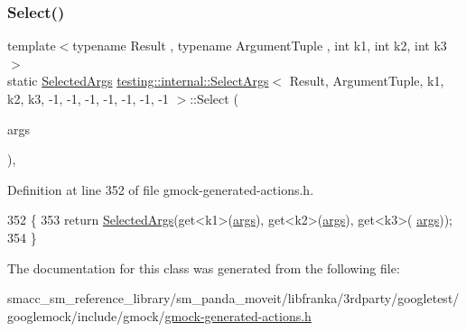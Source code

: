 \subsubsection{\texorpdfstring{Select()}{Select()}}
{\footnotesize\ttfamily template$<$typename Result , typename Argument\+Tuple , int k1, int k2, int k3$>$ \\
static \hyperlink{classtesting_1_1internal_1_1SelectArgs_3_01Result_00_01ArgumentTuple_00_01k1_00_01k2_00_01k3_00_4b8877f94cb457a4d2bd6b2630090309_a6780fe203ee6f054ad07b84d9ec68dfd}{Selected\+Args} \hyperlink{classtesting_1_1internal_1_1SelectArgs}{testing\+::internal\+::\+Select\+Args}$<$ Result, Argument\+Tuple, k1, k2, k3, -\/1, -\/1, -\/1, -\/1, -\/1, -\/1, -\/1 $>$\+::Select (\begin{DoxyParamCaption}\item[{const Argument\+Tuple \&}]{args }\end{DoxyParamCaption})\hspace{0.3cm}{\ttfamily [inline]}, {\ttfamily [static]}}



Definition at line 352 of file gmock-\/generated-\/actions.\+h.


\begin{DoxyCode}
352                                                         \{
353     \textcolor{keywordflow}{return} \hyperlink{classtesting_1_1internal_1_1SelectArgs_3_01Result_00_01ArgumentTuple_00_01k1_00_01k2_00_01k3_00_4b8877f94cb457a4d2bd6b2630090309_a6780fe203ee6f054ad07b84d9ec68dfd}{SelectedArgs}(get<k1>(\hyperlink{namespacegenerate__debs_a75f9143e38df82d83b2e8a6f99cae02c}{args}), get<k2>(\hyperlink{namespacegenerate__debs_a75f9143e38df82d83b2e8a6f99cae02c}{args}), get<k3>(
      \hyperlink{namespacegenerate__debs_a75f9143e38df82d83b2e8a6f99cae02c}{args}));
354   \}
\end{DoxyCode}


The documentation for this class was generated from the following file\+:\begin{DoxyCompactItemize}
\item 
smacc\+\_\+sm\+\_\+reference\+\_\+library/sm\+\_\+panda\+\_\+moveit/libfranka/3rdparty/googletest/googlemock/include/gmock/\hyperlink{gmock-generated-actions_8h}{gmock-\/generated-\/actions.\+h}\end{DoxyCompactItemize}
